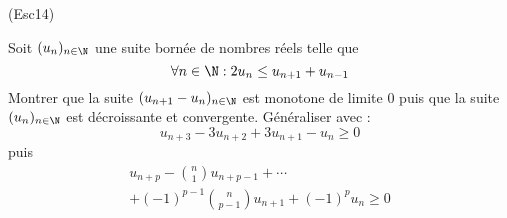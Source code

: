 \begin{tiny}(Esc14)\end{tiny} Soit $(u_n)_{n\in\N}$ une suite bornée de nombres réels telle que 
\begin{displaymath}
 \forall n\in \N : 2u_n \leq u_{n+1} + u_{n-1}
\end{displaymath}
Montrer que la suite $(u_{n+1}-u_n)_{n\in \N}$ est monotone de limite $0$ puis que la suite $(u_n)_{n\in\N}$ est décroissante et convergente. Généraliser avec :
\begin{displaymath}
 u_{n+3}-3u_{n+2}+3u_{n+1} - u_n \geq 0
\end{displaymath}
puis
\begin{multline*}
 u_{n+p}-\binom{n}{1}u_{n+p-1}+ \cdots \\+ (-1)^{p-1}\binom{n}{p-1} u_{n+1} +(-1)^p u_n \geq 0 
\end{multline*}

